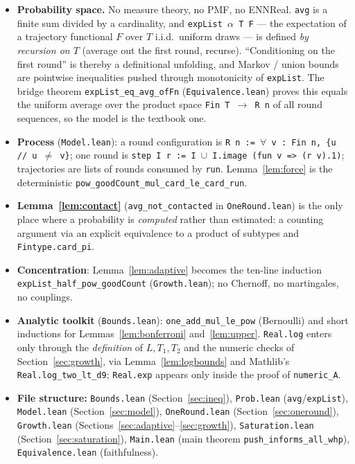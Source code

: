 \documentclass[11pt]{article}
\begin{document}
\begin{itemize}[leftmargin=2em]
\item \textbf{Probability space.} No measure theory, no PMF, no ENNReal.
  \texttt{avg} is a finite sum divided by a cardinality, and
  \texttt{expList $\alpha$ T F} — the expectation of a trajectory functional
  $F$ over $T$ i.i.d.\ uniform draws — is defined \emph{by recursion on $T$}
  (average out the first round, recurse).  ``Conditioning on the first
  round'' is thereby a definitional unfolding, and Markov / union bounds are
  pointwise inequalities pushed through monotonicity of \texttt{expList}.
  The bridge theorem \texttt{expList\_eq\_avg\_ofFn}
  (\texttt{Equivalence.lean}) proves this equals the uniform average over
  the product space \texttt{Fin T $\to$ R n} of all round sequences, so the
  model is the textbook one.
\item \textbf{Process} (\texttt{Model.lean}): a round configuration is
  \texttt{R n := $\forall$ v : Fin n, \{u // u $\ne$ v\}}; one round is
  \texttt{step I r := I $\cup$ I.image (fun v => (r v).1)}; trajectories are
  lists of rounds consumed by \texttt{run}.  Lemma~\ref{lem:force} is the
  deterministic \texttt{pow\_goodCount\_mul\_card\_le\_card\_run}.
\item \textbf{Lemma~\ref{lem:contact}} (\texttt{avg\_not\_contacted} in
  \texttt{OneRound.lean}) is the only place where a probability is
  \emph{computed} rather than estimated: a counting argument via an
  explicit equivalence to a product of subtypes and
  \texttt{Fintype.card\_pi}.
\item \textbf{Concentration}: Lemma~\ref{lem:adaptive} becomes the
  ten-line induction \texttt{expList\_half\_pow\_goodCount}
  (\texttt{Growth.lean}); no Chernoff, no martingales, no couplings.
\item \textbf{Analytic toolkit} (\texttt{Bounds.lean}):
  \texttt{one\_add\_mul\_le\_pow} (Bernoulli) and short inductions for
  Lemmas~\ref{lem:bonferroni} and~\ref{lem:upper}.  \texttt{Real.log}
  enters only through the \emph{definition} of $L, T_1, T_2$ and the
  numeric checks of Section~\ref{sec:growth}, via
  Lemma~\ref{lem:logbounds} and Mathlib's
  \texttt{Real.log\_two\_lt\_d9}; \texttt{Real.exp} appears only inside the
  proof of \texttt{numeric\_A}.
\item \textbf{File structure:}
  \texttt{Bounds.lean} (Section~\ref{sec:ineq}),
  \texttt{Prob.lean} (\texttt{avg}/\texttt{expList}),
  \texttt{Model.lean} (Section~\ref{sec:model}),
  \texttt{OneRound.lean} (Section~\ref{sec:oneround}),
  \texttt{Growth.lean} (Sections~\ref{sec:adaptive}--\ref{sec:growth}),
  \texttt{Saturation.lean} (Section~\ref{sec:saturation}),
  \texttt{Main.lean} (main theorem
  \texttt{push\_informs\_all\_whp}),
  \texttt{Equivalence.lean} (faithfulness).
\end{itemize}
\end{document}

